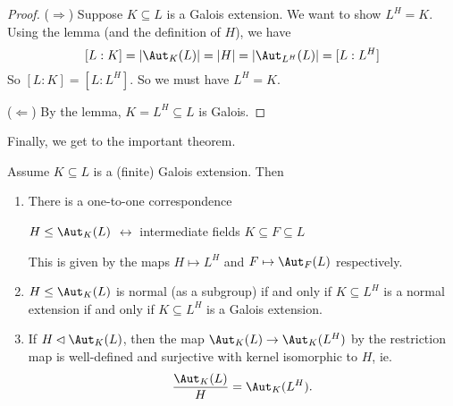 \documentclass[a4paper]{article}
\begin{document}
\begin{proof}
  ($\Rightarrow$) Suppose $K\subseteq L$ is a Galois extension. We want to show $L^H = K$. Using the lemma (and the definition of $H$), we have
  \[
    [L:K] = |\Aut_K(L)| = |H| = |\Aut_{L^H}(L)| = [L:L^H]
  \]
  So $[L:K] = [L:L^H]$. So we must have $L^H = K$.

  ($\Leftarrow$) By the lemma, $K = L^H \subseteq L$ is Galois.
\end{proof}

Finally, we get to the important theorem.
\begin{thm}
  Assume $K\subseteq L$ is a (finite) Galois extension. Then
  \begin{enumerate}
    \item There is a one-to-one correspondence
      \begin{center}
        $H\leq \Aut_K(L)$ $\longleftrightarrow$ intermediate fields $K\subseteq F \subseteq L$
      \end{center}
      This is given by the maps $H \mapsto L^H$ and $F\mapsto \Aut_F(L)$ respectively.
    \item $H\leq \Aut_K(L)$  is normal (as a subgroup) if and only if $K \subseteq L^H$ is a normal extension if and only if $K\subseteq L^H$ is a Galois extension.
    \item If $H\lhd \Aut_K(L)$, then the map $\Aut_K(L) \to \Aut_K(L^H)$ by the restriction map is well-defined and surjective with kernel isomorphic to $H$, ie.
      \[
        \frac{\Aut_K(L)}{H} = \Aut_K(L^H).
      \]
  \end{enumerate}
\end{thm}
\end{document}
